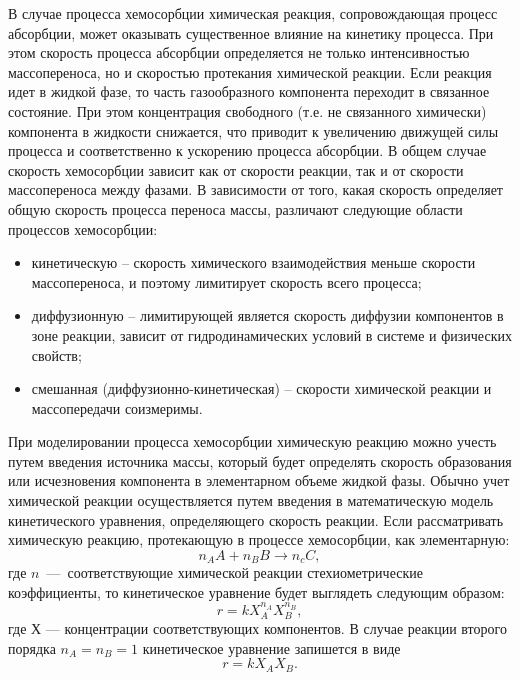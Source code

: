 В случае процесса хемосорбции химическая реакция, сопровождающая процесс абсорбции, может оказывать существенное влияние на кинетику процесса. При этом скорость процесса абсорбции определяется не только интенсивностью массопереноса, но и скоростью протекания химической реакции. Если реакция идет в жидкой фазе, то часть газообразного компонента переходит в связанное состояние. При этом концентрация свободного (т.е. не связанного химически) компонента в жидкости снижается, что приводит к увеличению движущей силы процесса и соответственно к ускорению процесса абсорбции. В общем случае скорость хемосорбции зависит как от скорости реакции, так и от скорости массопереноса между фазами. В зависимости от того, какая скорость определяет общую скорость процесса переноса массы, различают следующие области процессов хемосорбции:
\begin{itemize}
	\item кинетическую – скорость химического взаимодействия меньше скорости массопереноса, и поэтому лимитирует скорость всего процесса;
	\item  диффузионную – лимитирующей является скорость диффузии компонентов в зоне реакции, зависит от гидродинамических условий в системе и физических свойств;
	\item смешанная (диффузионно-кинетическая) – скорости химической реакции и массопередачи соизмеримы.
\end{itemize}

При моделировании процесса хемосорбции химическую реакцию можно учесть путем введения источника массы, который будет определять скорость образования или исчезновения компонента в элементарном объеме жидкой фазы. Обычно учет химической реакции осуществляется путем введения в математическую модель кинетического уравнения, определяющего скорость реакции. Если рассматривать химическую реакцию, протекающую в процессе хемосорбции, как элементарную:
\begin{equation}
	n_A A + n_B B \rightarrow n_c C,
\end{equation}
где $n$ --- соответствующие химической реакции стехиометрические коэффициенты, то кинетическое уравнение будет выглядеть следующим образом:
\begin{equation}
	r=k X_A^{n_A} X_B^{n_B},
\end{equation}
где $Х$ --- концентрации соответствующих компонентов. В случае реакции второго порядка $n_A=n_B=1$  кинетическое уравнение запишется в виде
\begin{equation}
r=k X_A X_B.
\end{equation}

